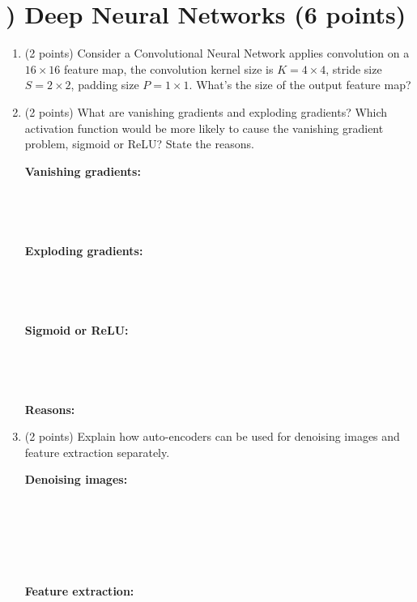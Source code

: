 \documentclass[11pt]{article}
\newcounter{QuestionCounter}
\begin{document}
\section*{) Deep Neural Networks (6 points)} 
\begin{enumerate}[(1)]
    \item (2 points) Consider a Convolutional Neural Network applies convolution on a $16\times 16$ feature map, the convolution kernel size is $K=4 \times 4$, stride size $S=2 \times 2$, padding size $P=1 \times 1$. What's the size of the output feature map?\\
    \begin{answertext}{6cm}{}
    
    \end{answertext}

    \item (2 points) What are vanishing gradients and exploding gradients? Which activation function would be more likely to cause the vanishing gradient problem, sigmoid or ReLU? State the reasons.
    
    \begin{answertext}{12cm}{}
        \textbf{Vanishing gradients:} \\\\\\\\\\
        \textbf{Exploding gradients:}\\\\\\\\\\
        \textbf{Sigmoid or ReLU:} \\\\\\\\\\
        \textbf{Reasons:}
    \end{answertext}
    \newpage
    \item (2 points) Explain how auto-encoders can be used for denoising images and feature extraction separately. 
    
    \begin{answertext}{10cm}{}
        \textbf{Denoising images:} \\\\\\\\\\\\\\
        \textbf{Feature extraction:}
    \end{answertext}
\end{enumerate}
\end{document}
